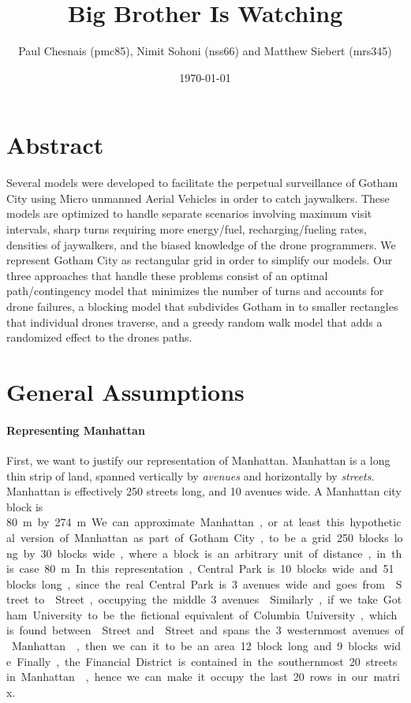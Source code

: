 \documentclass{article}
\title{Big Brother Is Watching}
\author{Paul Chesnais (pmc85), Nimit Sohoni (nss66) and Matthew Siebert (mrs345)}
\date{\today}
\begin{document}
\maketitle
\thispagestyle{empty}

\section{Abstract}
\label{sec:abstract}
Several models were developed to facilitate the perpetual surveillance of Gotham City using Micro unmanned Aerial Vehicles in order to catch jaywalkers. These models are optimized to handle separate scenarios involving maximum visit intervals, sharp turns requiring more energy/fuel, recharging/fueling rates, densities of jaywalkers, and the biased knowledge of the drone programmers. We represent Gotham City as rectangular grid in order to simplify our models. Our three approaches that handle these problems consist of an optimal path/contingency model that minimizes the number of turns and accounts for drone failures, a blocking model that subdivides Gotham in to smaller rectangles that individual drones traverse, and a greedy random walk model that adds a randomized effect to the drones paths.
\section{General Assumptions}
\label{sec:general_assumptions}
\paragraph{Representing Manhattan}
\label{par:representing_manhattan}
First, we want to justify our representation of Manhattan. Manhattan is a long thin strip of land, spanned vertically by \emph{avenues} and horizontally by \emph{streets}. Manhattan is effectively 250 streets long, and 10 avenues wide. A Manhattan city block is \SI{80}\m by \SI{274}\m. We can approximate Manhattan, or at least this hypothetical version of Manhattan as part of Gotham City, to be a grid 250 blocks long by 30 blocks wide, where a block is an arbitrary unit of distance, in this case \SI{80}\m. In this representation, Central Park is 10 blocks wide and 51 blocks long, since the real Central Park is 3 avenues wide and goes from  Street to  Street, occupying the middle 3 avenues \cite{centralpark}. Similarly, if we take Gotham University to be the fictional equivalent of Columbia University, which is found between  Street and  Street and spans the 3 westernmost avenues of Manhattan \cite{columbia}, then we can it to be an area 12 block long and 9 blocks wide. Finally, the Financial District is contained in the southernmost 20 streets in Manhattan \cite{financial}, hence we can make it occupy the last 20 rows in our matrix.
\end{document}
